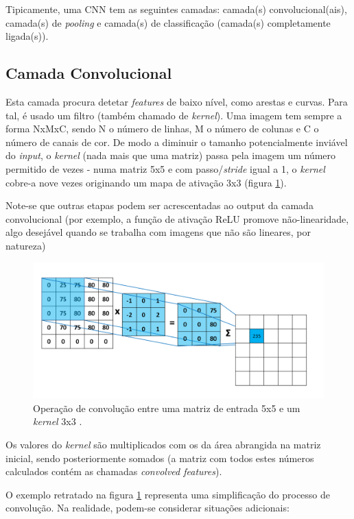 \noindent Tipicamente, uma CNN tem as seguintes camadas: camada(s) convolucional(ais), camada(s) de \textit{pooling} e camada(s) de classificação (camada(s) completamente ligada(s)).

\subsection{Camada Convolucional}
\label{chap2:subsec:convolucional}
Esta camada procura detetar \textit{features} de baixo nível, como arestas e curvas. Para tal, é usado um filtro (também chamado de \textit{kernel}). Uma imagem tem sempre a forma NxMxC, sendo N o número de linhas, M o número de colunas e C o número de canais de cor. De modo a diminuir o tamanho potencialmente inviável do \textit{input}, o \textit{kernel} (nada mais que uma matriz) passa pela imagem um número permitido de vezes - numa matriz 5x5 e com passo/\textit{stride} igual a 1, o \textit{kernel} cobre-a nove vezes originando um mapa de ativação 3x3 (figura \ref{fig:kernel}).


\noindent Note-se que outras etapas podem ser acrescentadas ao output da camada convolucional (por exemplo, a função de ativação ReLU promove não-linearidade, algo desejável quando se trabalha com imagens que não são lineares, por natureza) 

\begin{figure}[h]
\centering
\includegraphics[width=350pt]{kernel.png}
\caption{Operação de convolução entre uma matriz de entrada 5x5 e um \textit{kernel} 3x3 \cite{kernel}.}
\label{fig:kernel}
\end{figure}

\noindent Os valores do \textit{kernel} são multiplicados com os da área abrangida na matriz inicial, sendo posteriormente somados (a matriz com todos estes números calculados contém as chamadas \textit{convolved features}).

\noindent O exemplo retratado na figura \ref{fig:kernel} representa uma simplificação do processo de convolução. Na realidade, podem-se considerar situações adicionais:


